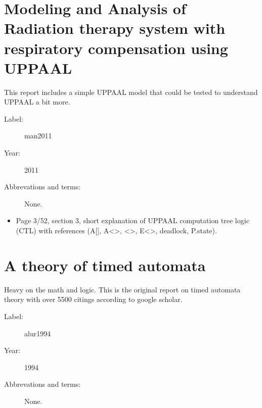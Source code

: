 \section{Modeling and Analysis of Radiation therapy system with respiratory
compensation using UPPAAL}
This report includes a simple UPPAAL model that could be tested to understand
UPPAAL a bit more.

\begin{description}
    \item[Label:] man2011 \cite{man2011}
    \item[Year:] 2011
    \item[Abbrevations and terms:] None.
\end{description}

\begin{itemize}
    \item Page 3/52, section 3, short explanation of UPPAAL computation tree
    logic (CTL) with references (A[], A\textless\textgreater,
    \textless\textgreater, E\textless\textgreater, deadlock, P.state).
\end{itemize}

\section{A theory of timed automata}
Heavy on the math and logic. This is the original report on timed automata
theory with over 5500 citings according to google scholar.

\begin{description}
    \item[Label:] alur1994 \cite{alur1994}
    \item[Year:] 1994
    \item[Abbrevations and terms:] None.
\end{description}

